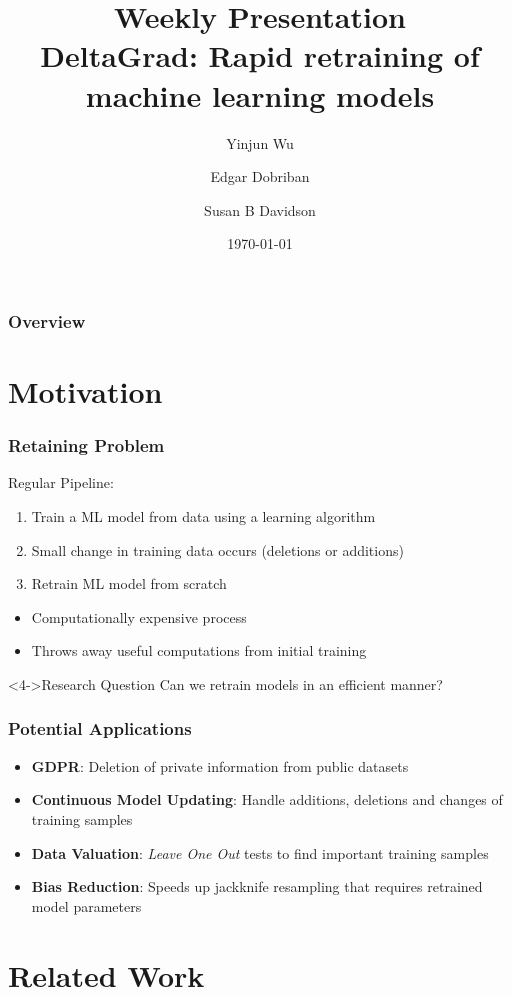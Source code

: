 \documentclass{beamer}
\title[DeltaGrad]{Weekly Presentation\\DeltaGrad: Rapid retraining of machine learning models}
\author[Wu et al.~]{Yinjun Wu \and Edgar Dobriban \and Susan B Davidson}
\date{\today}
\begin{document}
\begin{frame}
    \titlepage
\end{frame}

\begin{frame}
    \frametitle{Overview}
    \tableofcontents
\end{frame}


\section{Motivation}
\begin{frame}
    \frametitle{Retaining Problem}
    Regular Pipeline:
    \begin{enumerate}
      \item Train a ML model from data using a learning algorithm
      \item Small change in training data occurs (deletions or additions)
      \item Retrain ML model from scratch
    \end{enumerate}

    \begin{itemize}
      \item<2-> Computationally expensive process
      \item<3-> Throws away useful computations from initial training
    \end{itemize}
    \begin{block}<4->{Research Question}
      Can we retrain models in an efficient manner?
    \end{block}
\end{frame}

\begin{frame}
  \frametitle{Potential Applications}
  \begin{itemize}
    \item<1-> \textbf{GDPR}: Deletion of private information from public datasets
    \item<2-> \textbf{Continuous Model Updating}: Handle additions, deletions and changes of training samples
    \item<3-> \textbf{Data Valuation}: \textit{Leave One Out} tests to find important training samples 
    \item<4-> \textbf{Bias Reduction}: Speeds up jackknife resampling that requires retrained model parameters 
  \end{itemize}
  

\end{frame}
\section{Related Work}
\end{document}
